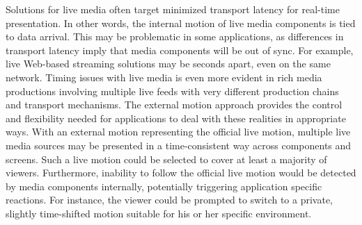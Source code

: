 Solutions for live media often target minimized transport latency for real-time 
presentation. In other words, the internal motion of live media
components is tied to data arrival. This may be problematic in some
applications, as differences in transport latency imply that media components
will be out of sync. For example, live Web-based streaming solutions may be
seconds apart, even on the same network. Timing issues with live media is even
more evident in rich media productions involving multiple live feeds with very
different production chains and transport mechanisms. The external motion
approach provides the control and flexibility needed for applications to deal
with these realities in appropriate ways. With an external motion representing
the official live motion, multiple live media sources may be presented in a
time-consistent way across components and screens. Such a live motion could be
selected to cover at least a majority of viewers. Furthermore, inability to
follow the official live motion would be detected by media components
internally, potentially triggering application specific reactions. For
instance, the viewer could be prompted to switch to a private, slightly time-shifted 
motion suitable for his or her specific environment.

